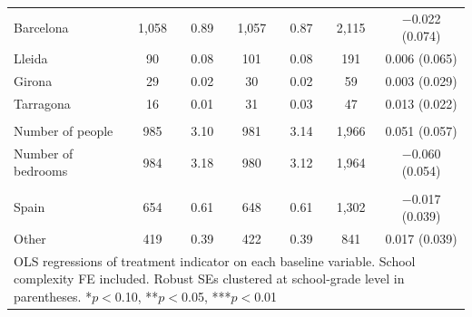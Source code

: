 \begin{center}
{\begin{tabular}{@{}lcccccc@{}}
  \hspace{1.5em}Barcelona & 1,058 & 0.89 & 1,057 & 0.87 & 2,115 & $-$0.022 (0.074) \\                                                 
  \hspace{1.5em}Lleida & 90 & 0.08 & 101 & 0.08 & 191 & 0.006 (0.065) \\                                                              
  \hspace{1.5em}Girona & 29 & 0.02 & 30 & 0.02 & 59 & 0.003 (0.029) \\                                                                
  \hspace{1.5em}Tarragona & 16 & 0.01 & 31 & 0.03 & 47 & 0.013 (0.022) \\                                                             
  \addlinespace[1pt]                                                                                                                  
  \multicolumn{3}{l}{\textit{Household Characteristics}}\\                                                                            
  \hspace{1.5em}Number of people & 985 & 3.10 & 981 & 3.14 & 1,966 & 0.051 (0.057) \\                                                 
  \hspace{1.5em}Number of bedrooms & 984 & 3.18 & 980 & 3.12 & 1,964 & $-$0.060 (0.054) \\
  \addlinespace[1pt]                                                                                                                  
  \multicolumn{3}{l}{\textit{Caregivers' Country of Origin}}\\
  \hspace{1.5em}Spain & 654 & 0.61 & 648 & 0.61 & 1,302 & $-$0.017 (0.039) \\                                                         
  \hspace{1.5em}Other & 419 & 0.39 & 422 & 0.39 & 841 & 0.017 (0.039) \\                                                              
  \midrule                                                                                                                            
  \multicolumn{7}{p{14cm}}{\tiny OLS regressions of treatment indicator on each baseline variable. School complexity FE included.     
  Robust SEs clustered at school-grade level in parentheses. *$p<$0.10, **$p<$0.05, ***$p<$0.01} \\                                   
  \bottomrule                            
  \end{tabular}                                                                                                                       
  }%
  \end{center}                           
                                                                                                                  